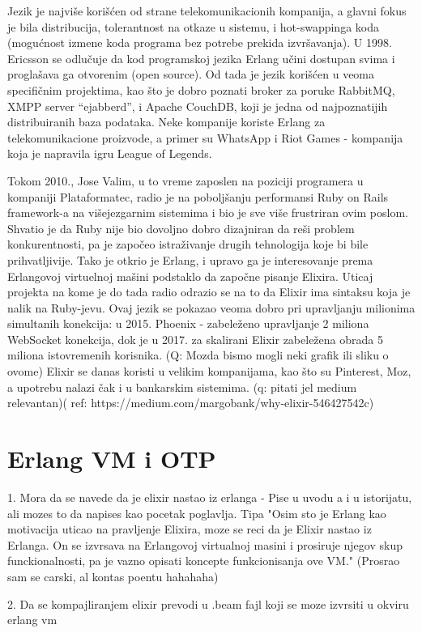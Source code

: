 \documentclass[a4paper]{article}
\begin{document}
Jezik je najviše korišćen od strane telekomunikacionih kompanija, a glavni fokus je bila distribucija, tolerantnost na otkaze u sistemu, i hot-swappinga koda (mogućnost izmene koda programa bez potrebe prekida izvršavanja). U 1998. Ericsson se odlučuje da kod programskoj jezika Erlang učini dostupan svima i proglašava ga otvorenim (open source). Od tada je jezik korišćen u veoma specifičnim projektima, kao što je dobro poznati broker za poruke RabbitMQ, XMPP server “ejabberd”, i Apache CouchDB, koji je jedna od najpoznatijih distribuiranih baza podataka. Neke kompanije koriste Erlang za telekomunikacione proizvode, a primer su WhatsApp i Riot Games - kompanija koja je napravila igru League of Legends.

Tokom 2010., Jose Valim, u to vreme zaposlen na poziciji programera u kompaniji Plataformatec, radio je na poboljšanju performansi Ruby on Rails framework-a na višejezgarnim sistemima i bio je sve više frustriran ovim poslom. Shvatio je da Ruby nije bio dovoljno dobro dizajniran da reši problem konkurentnosti, pa je započeo istraživanje drugih tehnologija koje bi bile prihvatljivije. Tako je otkrio je Erlang, i upravo ga je interesovanje prema Erlangovoj virtuelnoj mašini podstaklo da započne pisanje Elixira. Uticaj projekta na kome je do tada radio odrazio se na to da Elixir ima sintaksu koja je nalik na Ruby-jevu. Ovaj jezik se pokazao veoma dobro pri upravljanju milionima simultanih konekcija: u 2015. Phoenix - zabeleženo upravljanje 2 miliona WebSocket konekcija, dok je u 2017. za skalirani Elixir zabeležena obrada 5 miliona istovremenih korisnika. (Q: Mozda bismo mogli neki grafik ili sliku o ovome) Elixir se danas koristi u velikim kompanijama, kao što su Pinterest, Moz, a upotrebu nalazi čak i u bankarskim sistemima. (q: pitati jel medium relevantan)( ref: https://medium.com/margobank/why-elixir-546427542c)

\section{Erlang VM i OTP}
1. Mora da se navede da je elixir nastao iz erlanga
    - Pise u uvodu a i u istorijatu, ali mozes to da napises kao pocetak poglavlja. Tipa "Osim sto je Erlang kao motivacija uticao na pravljenje Elixira, moze se reci da je Elixir nastao iz Erlanga. On se izvrsava na Erlangovoj virtualnoj masini i prosiruje njegov skup funckionalnosti, pa je vazno opisati koncepte funkcionisanja ove VM." (Prosrao sam se carski, al kontas poentu hahahaha)

2. Da se kompajliranjem elixir prevodi u .beam fajl koji se moze izvrsiti u okviru erlang vm
\end{document}
